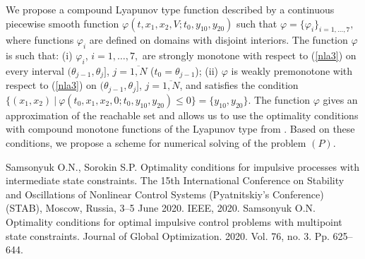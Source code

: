 \documentclass[12pt]{llncs}
\begin{document}
We propose a compound Lyapunov type function described by a continuous  piecewise smooth function $\varphi(t,x_1,x_2,V;t_0,y_{10},y_{20})$ such that $\varphi = \big\{ \varphi_i\big\}_{i=1,\ldots,7} ,$ where functions $\varphi_i$ are defined on   domains with disjoint interiors. The function $\varphi$ is such that: (i)    $\varphi_i$, $i=1,\ldots,7,$ are strongly monotone with respect to  (\ref{nla3})  on every interval $(\theta_{j-1},\theta_j]$, $j=\overline{1,N}$  ($t_0=\theta_{j-1}$); (ii)    $\varphi$ is weakly premonotone with respect to    (\ref{nla3}) on   $(\theta_{j-1},\theta_j]$, $j=\overline{1,N}$, and satisfies the condition
$
\big\{(x_1,x_2)\ |\  \varphi(t_0,x_1,x_2,0;t_0,y_{10},y_{20})\leq 0\big\}=\{y_{10},y_{20}\}.
$ 
The function $\varphi$ gives an approximation of the reachable set and allows us to use the optimality conditions with compound monotone functions of the Lyapunov type   from   \cite{samnla2,samnla1}. Based on these conditions, we propose a scheme for numerical solving of the problem $(P)$.

\begin{thebibliography}{5}
 Samsonyuk O.N., Sorokin S.P. Optimality conditions for impulsive
processes with intermediate state constraints.  The 15th International Conference on
Stability and Oscillations of Nonlinear Control Systems (Pyatnitskiy's Conference)
(STAB), Moscow, Russia, 3--5  June 2020.  IEEE, 2020.  %
 Samsonyuk O.N. Optimality conditions for optimal impulsive control
problems with multipoint state constraints. Journal of Global Optimization. 2020. Vol.
76, no. 3. Pp. 625--644. %
\end{thebibliography}



\end{document}
